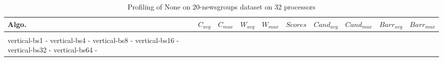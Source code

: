 \begin{table*}[htbp]
\centering
 \begin{tabular}{l r r r r r r r r r}
Algo. & $C_{avg}$ & $C_{max}$ & $W_{avg}$ & $W_{max}$ & $Scores$ & $Cand_{avg}$ & $Cand_{max}$ & $Barr_{avg}$ & $Barr_{max}$ \\
\hline \\
vertical-bs1 - vertical-bs4 - vertical-bs8 - vertical-bs16 - vertical-bs32 - vertical-bs64 -  
\end{tabular}
\caption{Profiling of None on 20-newsgroups dataset on 32 processors }
\label{tab:20-newsgroups:32}
\end{table*}
